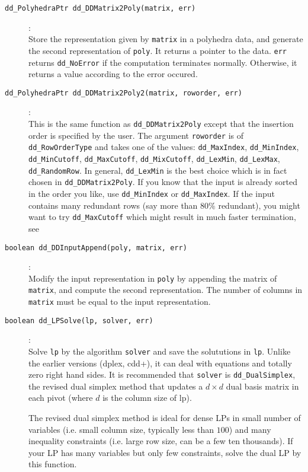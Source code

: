 \documentclass[11pt]{article}
\newcommand {\0} {{\bf 0}}
\begin{document}
\begin{description}
\item[{\tt dd\_PolyhedraPtr dd\_DDMatrix2Poly(matrix, err)}]:\\
Store the representation given by {\tt matrix} in a polyhedra data, and
generate the second representation of {\tt *poly}.  It returns
a pointer to the data. {\tt *err}
returns {\tt dd\_NoError} if the computation terminates normally.  Otherwise,
it returns a value according to the error occured.

\item[{\tt dd\_PolyhedraPtr dd\_DDMatrix2Poly2(matrix, roworder, err)}]:\\
This is the same function as  {\tt dd\_DDMatrix2Poly} except that the insertion
order is specified by the user.  The argument {\tt roworder} is of {\tt dd\_RowOrderType}
and takes one of the values:
  {\tt dd\_MaxIndex}, {\tt dd\_MinIndex}, {\tt dd\_MinCutoff}, {\tt dd\_MaxCutoff}, {\tt dd\_MixCutoff},
   {\tt dd\_LexMin}, {\tt dd\_LexMax}, {\tt dd\_RandomRow}.   In general, {\tt dd\_LexMin} is
the best choice which is in fact chosen in {\tt dd\_DDMatrix2Poly}.  If you know that 
the input is already sorted in the order you like, use  {\tt dd\_MinIndex} or  {\tt dd\_MaxIndex}.
If the input contains many redundant rows (say more than $80\%$ redundant),
you might want to try {\tt dd\_MaxCutoff} which might result in much faster termination,
see \cite{abs-hgach-97,fp-ddmr-96}

\item[{\tt boolean dd\_DDInputAppend(poly, matrix, err)}]:\\
Modify the input representation in {\tt *poly}
by appending the matrix of {\tt *matrix}, and compute
the second representation.  The number of columns in
{\tt *matrix} must be equal to the input representation.

\item[{\tt boolean dd\_LPSolve(lp, solver, err)}]:\\
Solve {\tt lp} by the algorithm {\tt solver} and save
the solututions in {\tt *lp}.  Unlike the earlier versions
(dplex, cdd+), it can deal with equations and totally zero right
hand sides.   It is recommended that {\tt solver} is
{\tt dd\_DualSimplex}, the revised dual simplex method
that updates a $d\times d$ dual basis matrix in each pivot (where
$d$ is the column size of lp).

The revised dual simplex method is ideal for dense LPs in small number of variables 
(i.e. small column size, typically less than $100$)
and many inequality constraints (i.e. large row size, can be a few ten thousands).  
If your LP has many variables but only few constraints, solve the dual LP by
this function.


\end{description}
\end{document}
